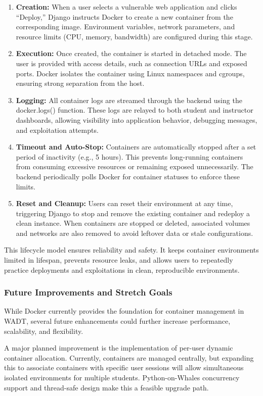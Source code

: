\documentclass[12pt]{article}
\begin{document}
\begin{enumerate}
    \item \textbf{Creation:} When a user selects a vulnerable web application and clicks “Deploy,” Django instructs Docker to create a new container from the corresponding image. Environment variables, network parameters, and resource limits (CPU, memory, bandwidth) are configured during this stage.
    \item \textbf{Execution:} Once created, the container is started in detached mode. The user is provided with access details, such as connection URLs and exposed ports. Docker isolates the container using Linux namespaces and cgroups, ensuring strong separation from the host.
    \item \textbf{Logging:} All container logs are streamed through the backend using the docker.logs() function. These logs are relayed to both student and instructor dashboards, allowing visibility into application behavior, debugging messages, and exploitation attempts.
    \item \textbf{Timeout and Auto-Stop:} Containers are automatically stopped after a set period of inactivity (e.g., 5 hours). This prevents long-running containers from consuming excessive resources or remaining exposed unnecessarily. The backend periodically polls Docker for container statuses to enforce these limits.
    \item \textbf{Reset and Cleanup:} Users can reset their environment at any time, triggering Django to stop and remove the existing container and redeploy a clean instance. When containers are stopped or deleted, associated volumes and networks are also removed to avoid leftover data or stale configurations.
\end{enumerate}

This lifecycle model ensures reliability and safety. It keeps container environments limited in lifespan, prevents resource leaks, and allows users to repeatedly practice deployments and exploitations in clean, reproducible environments.

\subsubsection{Future Improvements and Stretch Goals}
While Docker currently provides the foundation for container management in WADT, several future enhancements could further increase performance, scalability, and flexibility.

A major planned improvement is the implementation of per-user dynamic container allocation. Currently, containers are managed centrally, but expanding this to associate containers with specific user sessions will allow simultaneous isolated environments for multiple students. Python-on-Whales concurrency support and thread-safe design make this a feasible upgrade path.
\end{document}
